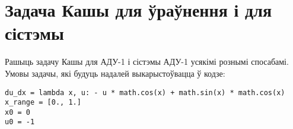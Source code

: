 \section*{Задача Кашы для ўраўнення і для сістэмы}

Рашыць задачу Кашы для АДУ-1 і сістэмы АДУ-1 усякімі рознымі спосабамі.\\
Умовы задачы, які будуць надалей выкарыстоўвацца ў кодзе:
\begin{verbatim}
du_dx = lambda x, u: - u * math.cos(x) + math.sin(x) * math.cos(x)
x_range = [0., 1.]
x0 = 0
u0 = -1
\end{verbatim}